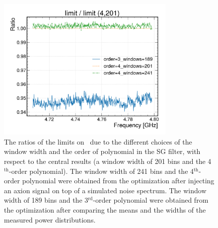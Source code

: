 \begin{figure} [htbp]
  \centering
  \includegraphics[width=8.6cm]{figures/sys_compareSG_4_201.png}
  \caption{The ratios of the limits on \gagg\ due to the different choices 
 of the window width and the order of polynomial in the SG filter, with 
respect to 
 the central results (a window width of 201 bins and the 4$^\text{th}$-order 
 polynomial). The window width of 241 bins and the 4$^\text{th}$-order 
 polynomial were obtained from the optimization after injecting an axion 
signal on top of a simulated noise spectrum. The window width of 189 bins and 
the 3$^\text{rd}$-order polynomial were obtained from the optimization 
 after comparing the means and the widths of the measured power distributions.}
  \label{fig:syssgfilter}
\end{figure}
 

